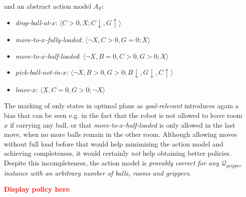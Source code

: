 \documentclass[letterpaper]{article} %
\newcommand{\tuple}[1]{\ensuremath{\langle #1 \rangle}}
\newcommand{\alert}[1]{\textcolor{red}{\bf #1}}
\newcommand{\Q}{\mathcal{Q}}
\begin{document}
\noindent and an abstract action model $A_F$:


\begin{itemize}
\item \emph{drop-ball-at-$x$}: \hspace*{\fill} \tuple{C>0, X;  C\downarrow, G \uparrow}
\item \emph{move-to-$x$-fully-loaded}: \hspace*{\fill} \tuple{\neg X, C>0, G=0;   X}
\item \emph{move-to-$x$-half-loaded}: \hspace*{\fill} \tuple{\neg X, B=0, C>0, G>0;   X}
\item \emph{pick-ball-not-in-$x$}: \hspace*{\fill} \tuple{\neg X, B > 0, G > 0;   B \downarrow, G \downarrow, C\uparrow}
\item \emph{leave-$x$}: \hspace*{\fill} \tuple{X, C=0, G > 0;   \neg X}
\end{itemize}

The marking of only states in optimal plans as \emph{goal-relevant} introduces again a bias
that can be seen e.g. in the fact that the robot is not allowed to leave room $x$ if carrying any ball,
or that \emph{move-to-$x$-half-loaded} is only allowed in the last move, when no more balls remain in the other room.
Although allowing moves without full load before that would help minimizing the action model and achieving completeness, it would certainly \emph{not}
help obtaining better policies.
%
Despite this incompleteness, the action model is \emph{provably correct for any $\Q_{gripper}$ instance with an arbitrary number of balls, 
rooms and grippers}.


\alert{Display policy here}


% 
% 
% 
% 
\end{document}
